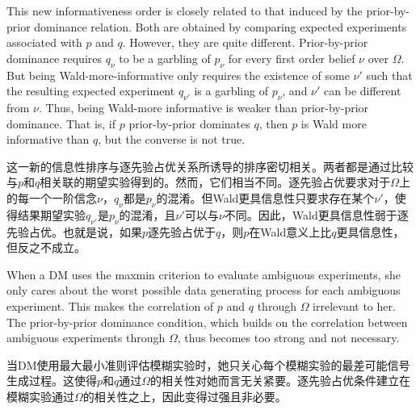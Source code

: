\documentclass[12pt,a4paper]{article}
\newenvironment{original}
  {\par\vspace{4pt}\noindent\color{black}\ignorespaces}
  {\par\vspace{2pt}}
\newenvironment{translation}
  {\par\vspace{2pt}\noindent\color{myblue}\ignorespaces}
  {\par\vspace{6pt}}
\begin{document}
\begin{original}
This new informativeness order is closely related to that induced by the prior-by-prior dominance relation. Both are obtained by comparing expected experiments associated with $p$ and $q$. However, they are quite different. Prior-by-prior dominance requires $q_{\nu}$ to be a garbling of $p_{\nu}$ for every first order belief $\nu$ over $\Omega$. But being Wald-more-informative only requires the existence of some $\nu'$ such that the resulting expected experiment $q_{\nu'}$ is a garbling of $p_{\nu}$, and $\nu'$ can be different from $\nu$. Thus, being Wald-more informative is weaker than prior-by-prior dominance. That is, if $p$ prior-by-prior dominates $q$, then $p$ is Wald more informative than $q$, but the converse is not true.
\end{original}

\begin{translation}
这一新的信息性排序与逐先验占优关系所诱导的排序密切相关。两者都是通过比较与$p$和$q$相关联的期望实验得到的。然而，它们相当不同。逐先验占优要求对于$\Omega$上的每一个一阶信念$\nu$，$q_{\nu}$都是$p_{\nu}$的混淆。但Wald更具信息性只要求存在某个$\nu'$，使得结果期望实验$q_{\nu'}$是$p_{\nu}$的混淆，且$\nu'$可以与$\nu$不同。因此，Wald更具信息性弱于逐先验占优。也就是说，如果$p$逐先验占优于$q$，则$p$在Wald意义上比$q$更具信息性，但反之不成立。
\end{translation}

\begin{original}
When a DM uses the maxmin criterion to evaluate ambiguous experiments, she only cares about the worst possible data generating process for each ambiguous experiment. This makes the correlation of $p$ and $q$ through $\Omega$ irrelevant to her. The prior-by-prior dominance condition, which builds on the correlation between ambiguous experiments through $\Omega$, thus becomes too strong and not necessary.
\end{original}

\begin{translation}
当DM使用最大最小准则评估模糊实验时，她只关心每个模糊实验的最差可能信号生成过程。这使得$p$和$q$通过$\Omega$的相关性对她而言无关紧要。逐先验占优条件建立在模糊实验通过$\Omega$的相关性之上，因此变得过强且非必要。
\end{translation}
\end{document}
